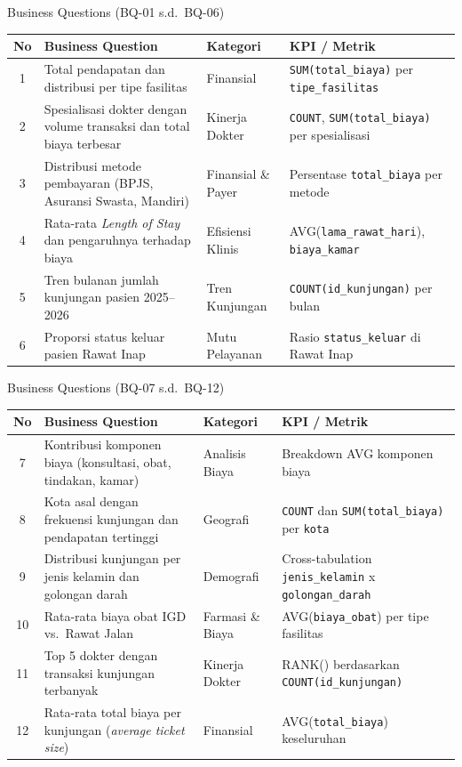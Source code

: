 \documentclass[xcolor=table,t,aspectratio=169]{beamer}
\begin{document}
\begin{frame}{Business Questions (BQ-01 s.d.\ BQ-06)}
  \scriptsize
  \begin{tabular}{cp{4.4cm}p{2.2cm}p{3.8cm}}
    \toprule
    \textbf{No} & \textbf{Business Question} & \textbf{Kategori} & \textbf{KPI / Metrik} \\
    \midrule
    1 & Total pendapatan dan distribusi per tipe fasilitas
      & Finansial & \texttt{SUM(total\_biaya)} per \texttt{tipe\_fasilitas} \\[2pt]
    2 & Spesialisasi dokter dengan volume transaksi dan total biaya terbesar
      & Kinerja Dokter & \texttt{COUNT}, \texttt{SUM(total\_biaya)} per spesialisasi \\[2pt]
    3 & Distribusi metode pembayaran (BPJS, Asuransi Swasta, Mandiri)
      & Finansial \& Payer & Persentase \texttt{total\_biaya} per metode \\[2pt]
    4 & Rata-rata \textit{Length of Stay} dan pengaruhnya terhadap biaya
      & Efisiensi Klinis & AVG(\texttt{lama\_rawat\_hari}), \texttt{biaya\_kamar} \\[2pt]
    5 & Tren bulanan jumlah kunjungan pasien 2025--2026
      & Tren Kunjungan & \texttt{COUNT(id\_kunjungan)} per bulan \\[2pt]
    6 & Proporsi status keluar pasien Rawat Inap
      & Mutu Pelayanan & Rasio \texttt{status\_keluar} di Rawat Inap \\
    \bottomrule
  \end{tabular}
\end{frame}

\begin{frame}{Business Questions (BQ-07 s.d.\ BQ-12)}
  \scriptsize
  \begin{tabular}{cp{4.4cm}p{2.2cm}p{3.8cm}}
    \toprule
    \textbf{No} & \textbf{Business Question} & \textbf{Kategori} & \textbf{KPI / Metrik} \\
    \midrule
    7  & Kontribusi komponen biaya (konsultasi, obat, tindakan, kamar)
       & Analisis Biaya & Breakdown AVG komponen biaya \\[2pt]
    8  & Kota asal dengan frekuensi kunjungan dan pendapatan tertinggi
       & Geografi & \texttt{COUNT} dan \texttt{SUM(total\_biaya)} per \texttt{kota} \\[2pt]
    9  & Distribusi kunjungan per jenis kelamin dan golongan darah
       & Demografi & Cross-tabulation \texttt{jenis\_kelamin} x \texttt{golongan\_darah} \\[2pt]
    10 & Rata-rata biaya obat IGD vs.\ Rawat Jalan
       & Farmasi \& Biaya & AVG(\texttt{biaya\_obat}) per tipe fasilitas \\[2pt]
    11 & Top 5 dokter dengan transaksi kunjungan terbanyak
       & Kinerja Dokter & RANK() berdasarkan \texttt{COUNT(id\_kunjungan)} \\[2pt]
    12 & Rata-rata total biaya per kunjungan (\textit{average ticket size})
       & Finansial & AVG(\texttt{total\_biaya}) keseluruhan \\
    \bottomrule
  \end{tabular}
\end{frame}
\end{document}
